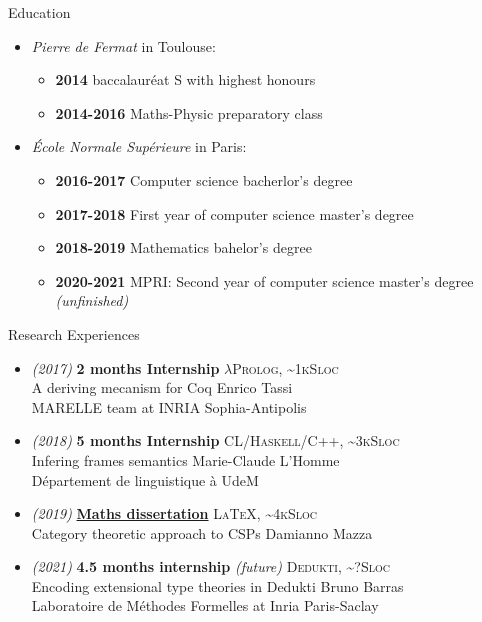 \documentclass[a4paper,11pt]{extarticle}
\newcommand{\cvtitle}[1]{
    \begin{tcolorbox}[colback=bgcol,colframe=ForestGreen,
        height=1cm, valign=center, sharp corners=downhill]
        {\Large #1}
    \end{tcolorbox}
}
\newcommand{\lang}[2]{\hfill \textsc{\scriptsize #1, \textasciitilde#2Sloc}}
\newcommand{\director}[1]{\hfill {\scriptsize #1}}
\begin{document}
    \begin{minipage}[c][282mm][t]{0.60\linewidth}

        \cvtitle{Education}

        \begin{itemize}
          \item \emph{Pierre de Fermat} in Toulouse:
                \begin{itemize}
                  \item \textbf{2014} baccalauréat S with highest honours
                  \item \textbf{2014-2016} Maths-Physic preparatory class
                \end{itemize}
          \item \emph{École Normale Supérieure} in Paris:
                \begin{itemize}
                  \item \textbf{2016-2017} Computer science bacherlor's degree
                  \item \textbf{2017-2018} First year of computer science master's degree
                  \item \textbf{2018-2019} Mathematics bahelor's degree
                  \item \textbf{2020-2021} MPRI: Second year of computer science master's degree \emph{(unfinished)}
                \end{itemize}
        \end{itemize}

        \cvtitle{Research Experiences}

        \begin{itemize}
          \item \emph{\small (2017)} \textbf{2 months Internship}
                \lang{$\lambda$Prolog}{1k}\\
                A deriving mecanism for Coq
                \director{Enrico Tassi} \\
                MARELLE team at INRIA Sophia-Antipolis
          \item \emph{\small (2018)} \textbf{5 months Internship}
                \lang{CL/Haskell/C++}{3k}\\
                Infering frames semantics
                \director{Marie-Claude L'Homme}\\
                Département de linguistique à UdeM
          \item \emph{\small (2019)} \textbf{\href{https://github.com/dwarfmaster/memoire-dma-l3}{Maths dissertation}}
                \lang{\LaTeX}{4k}\\
                Category theoretic approach to CSPs
                \director{Damianno Mazza}
          \item \emph{\small (2021)} \textbf{4.5 months internship} \emph{(future)}
                \lang{Dedukti}{?}\\
                Encoding extensional type theories in Dedukti
                \director{Bruno Barras} \\
                Laboratoire de Méthodes Formelles at Inria Paris-Saclay
        \end{itemize}


\end{minipage}
\end{document}
